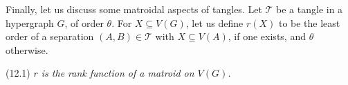 
Finally, let us discuss some matroidal aspects of tangles. Let $\mathscr{T}$ be a tangle in a hypergraph $G$, of order $\theta$. For $X \subseteq V(G)$, let us define $r(X)$ to be the least order of a separation $(A, B) \in \mathscr{T}$ with $X \subseteq V(A)$, if one exists, and $\theta$ otherwise.

\stmt
(12.1) \textit{$r$ is the rank function of a matroid on $V(G)$.}
